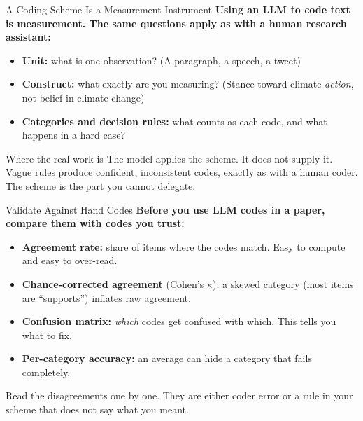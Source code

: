 \documentclass[aspectratio=169, 11pt]{beamer}
\begin{document}
\begin{frame}{A Coding Scheme Is a Measurement Instrument}
  \textbf{Using an LLM to code text is measurement. The same questions apply as with a human research assistant:}

  \vspace{0.4em}
  \begin{itemize}
    \item \textbf{Unit:} what is one observation? (A paragraph, a speech, a tweet)
    \item \textbf{Construct:} what exactly are you measuring? (Stance toward climate \emph{action}, not belief in climate change)
    \item \textbf{Categories and decision rules:} what counts as each code, and what happens in a hard case?
  \end{itemize}

  \vspace{0.6em}
  \begin{block}{Where the real work is}
    The model applies the scheme. It does not supply it. Vague rules produce confident, inconsistent codes, exactly as with a human coder. The scheme is the part you cannot delegate.
  \end{block}
\end{frame}

\begin{frame}{Validate Against Hand Codes}
  \textbf{Before you use LLM codes in a paper, compare them with codes you trust:}

  \vspace{0.4em}
  \begin{itemize}
    \item \textbf{Agreement rate:} share of items where the codes match. Easy to compute and easy to over-read.
    \item \textbf{Chance-corrected agreement} (Cohen's $\kappa$): a skewed category (most items are ``supports'') inflates raw agreement.
    \item \textbf{Confusion matrix:} \emph{which} codes get confused with which. This tells you what to fix.
    \item \textbf{Per-category accuracy:} an average can hide a category that fails completely.
  \end{itemize}

  \vspace{0.6em}
  \alert{Read the disagreements one by one. They are either coder error or a rule in your scheme that does not say what you meant.}
\end{frame}
\end{document}
